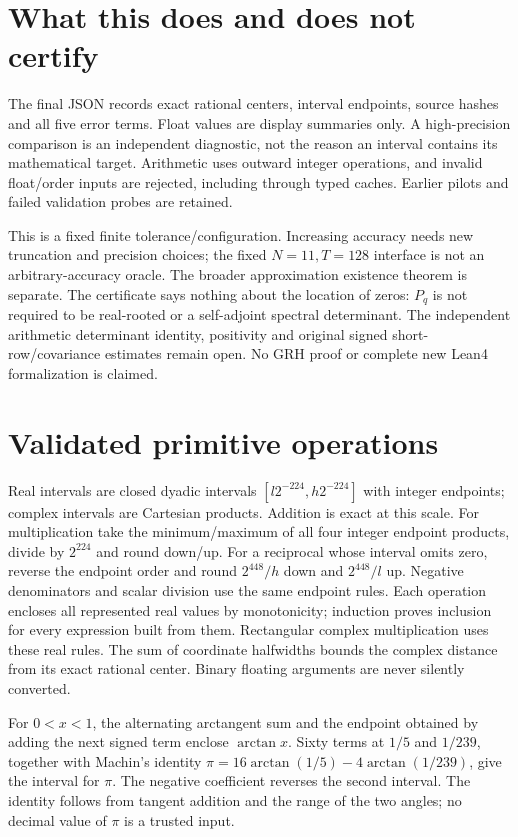 \documentclass[11pt,oneside,openany]{book}
\theoremstyle{definition}\newtheorem{definition}[theorem]{Definition}
\theoremstyle{remark}\newtheorem{remark}[theorem]{Remark}
\begin{document}
\section{What this does and does not certify}
The final JSON records exact rational centers, interval endpoints, source
hashes and all five error terms. Float values are display summaries only.
A high-precision comparison is an independent diagnostic, not the reason
an interval contains its mathematical target. Arithmetic uses outward
integer operations, and invalid float/order inputs are rejected, including
through typed caches. Earlier pilots and failed validation probes are retained.

This is a fixed finite tolerance/configuration. Increasing accuracy needs
new truncation and precision choices; the fixed $N=11,T=128$ interface is
not an arbitrary-accuracy oracle. The broader approximation existence theorem
is separate. The certificate says nothing about the location of zeros:
$P_q$ is not required to be real-rooted or a self-adjoint spectral determinant.
The independent arithmetic determinant identity, positivity and original
signed short-row/covariance estimates remain open. No GRH proof or complete
new Lean4 formalization is claimed.

\section{Validated primitive operations}
Real intervals are closed dyadic intervals $[l2^{-224},h2^{-224}]$ with
integer endpoints; complex intervals are Cartesian products. Addition is
exact at this scale. For multiplication take the minimum/maximum of all four
integer endpoint products, divide by $2^{224}$ and round down/up. For a
reciprocal whose interval omits zero, reverse the endpoint order and round
$2^{448}/h$ down and $2^{448}/l$ up. Negative denominators and scalar division
use the same endpoint rules. Each operation encloses all represented real
values by monotonicity; induction proves inclusion for every expression
built from them. Rectangular complex multiplication uses these real rules.
The sum of coordinate halfwidths bounds the complex distance from its exact
rational center. Binary floating arguments are never silently converted.

For $0<x<1$, the alternating arctangent sum and the endpoint obtained by
adding the next signed term enclose $\arctan x$. Sixty terms at $1/5$ and
$1/239$, together with Machin's identity
$\pi=16\arctan(1/5)-4\arctan(1/239)$, give the interval for $\pi$.
The negative coefficient reverses the second interval. The identity follows
from tangent addition and the range of the two angles; no decimal value of
$\pi$ is a trusted input.
\end{document}
